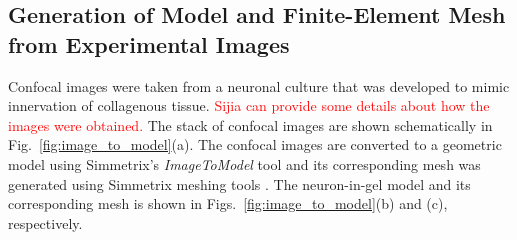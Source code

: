 \documentclass[10pt]{asme2ej}
\begin{document}
\subsection{Generation of Model and Finite-Element Mesh from Experimental Images}
Confocal images were taken from a neuronal culture that was developed to mimic innervation of collagenous tissue. \textcolor{red}{Sijia can provide some details about how the images were obtained.} The stack of confocal images are shown schematically in Fig.\ \ref{fig:image_to_model}(a). The confocal images are converted to a geometric model using Simmetrix's \textit{ImageToModel} tool \cite{simmetrix} and its corresponding mesh was generated using Simmetrix meshing tools \cite{simmetrix,Shephard:2000vc}. The neuron-in-gel model and its corresponding mesh is shown in Figs.\ \ref{fig:image_to_model}(b) and (c), respectively. 
%
\end{document}
